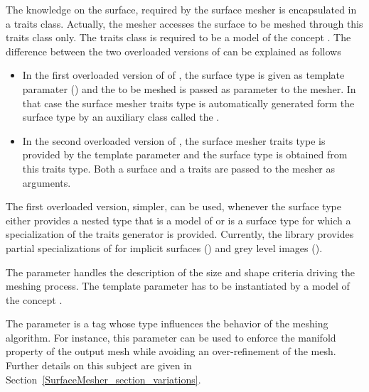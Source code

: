 The knowledge on the surface, required by the surface mesher
is  encapsulated in a
traits class. Actually, the mesher accesses the surface to be meshed
through this traits class only. 
The traits class is required to be a model
of the concept . 
The difference between the two overloaded versions of
can be explained as follows
\begin{itemize}
\item
In the first  overloaded version of
of ,  the surface type  is given  
as template paramater  () and the 
to be meshed is passed as parameter to the mesher.
In that case the surface mesher traits type 
is  automatically generated form the surface type
by an auxiliary class called  the .
\item In the second overloaded version of , 
the surface mesher traits type is provided
by the  template parameter 
and the surface type is obtained from this traits type.
Both  a surface and a traits 
are passed to the mesher as arguments. 
\end{itemize}


The first overloaded version,  simpler,  can be used,
whenever the surface type either provides  a nested type
that is  a model of 
or is a surface type for which a specialization
of the traits generator 
is provided.
Currently, the library provides partial specializations
of  
for implicit surfaces () and 
grey level images ().



The parameter  handles the description of the size and shape
criteria driving the meshing process. The template parameter 
has to be instantiated by a model of the concept .


The parameter   is a tag 
whose type influences the behavior of the
meshing algorithm. For instance, this parameter
can be used to enforce the manifold property
of the output mesh while avoiding 
an over-refinement of the mesh. Further details on this
subject are given in 
Section~\ref{SurfaceMesher_section_variations}.

